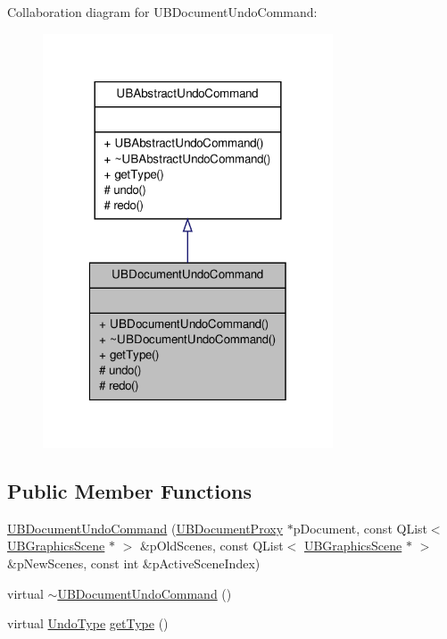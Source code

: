 Collaboration diagram for U\-B\-Document\-Undo\-Command\-:
\nopagebreak
\begin{figure}[H]
\begin{center}
\leavevmode
\includegraphics[width=244pt]{dc/d0b/class_u_b_document_undo_command__coll__graph}
\end{center}
\end{figure}
\subsection*{Public Member Functions}
\begin{DoxyCompactItemize}
\item 
\hyperlink{class_u_b_document_undo_command_a9403a14b3e3439c8f99790dc990632d8}{U\-B\-Document\-Undo\-Command} (\hyperlink{class_u_b_document_proxy}{U\-B\-Document\-Proxy} $\ast$p\-Document, const Q\-List$<$ \hyperlink{class_u_b_graphics_scene}{U\-B\-Graphics\-Scene} $\ast$ $>$ \&p\-Old\-Scenes, const Q\-List$<$ \hyperlink{class_u_b_graphics_scene}{U\-B\-Graphics\-Scene} $\ast$ $>$ \&p\-New\-Scenes, const int \&p\-Active\-Scene\-Index)
\item 
virtual \hyperlink{class_u_b_document_undo_command_aac655935dacc89c7d32fa85dcbf74649}{$\sim$\-U\-B\-Document\-Undo\-Command} ()
\item 
virtual \hyperlink{class_u_b_abstract_undo_command_a85016029bd4ceb03a8247b3c01e2bd97}{Undo\-Type} \hyperlink{class_u_b_document_undo_command_a556629be3ea48373fb6a212d93f19e91}{get\-Type} ()
\end{DoxyCompactItemize}
